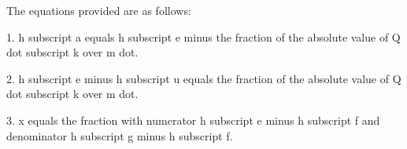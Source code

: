 The equations provided are as follows:

1. h subscript a equals h subscript e minus the fraction of the absolute value of Q dot subscript k over m dot.

2. h subscript e minus h subscript u equals the fraction of the absolute value of Q dot subscript k over m dot.

3. x equals the fraction with numerator h subscript e minus h subscript f and denominator h subscript g minus h subscript f.